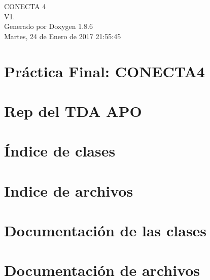 \documentclass[twoside]{article}
\begin{document}
\hypersetup{pageanchor=false}
\begin{titlepage}
\vspace*{7cm}
\begin{center}%
{\Large C\-O\-N\-E\-C\-T\-A 4 \\[1ex]\large V1. }\\
\vspace*{1cm}
{\large Generado por Doxygen 1.8.6}\\
\vspace*{0.5cm}
{\small Martes, 24 de Enero de 2017 21:55:45}\\
\end{center}
\end{titlepage}
\tableofcontents
{}
\hypersetup{pageanchor=true}

\section{Práctica Final\-: C\-O\-N\-E\-C\-T\-A4}
\label{index}\hypertarget{index}{}
\section{Rep del T\-D\-A A\-P\-O}
\label{repConjunto}
\hypertarget{repConjunto}{}

\section{Índice de clases}

\section{Indice de archivos}

\section{Documentación de las clases}









\section{Documentación de archivos}






\newpage
{}
{}
\printindex
\end{document}
